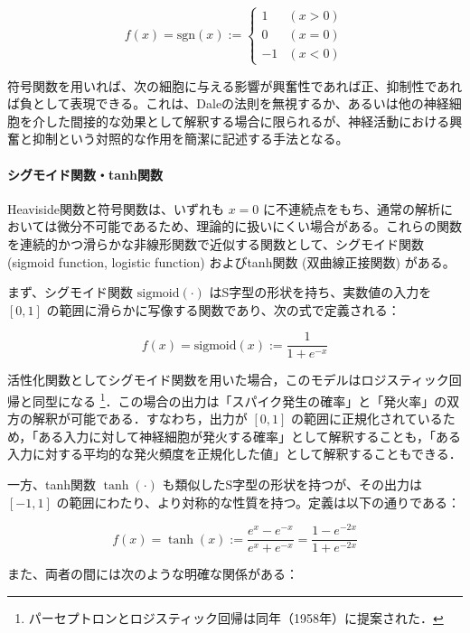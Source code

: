 \documentclass[titlepage]{ltjsbook}
\begin{document}
\begin{equation}
f(x) = \mathrm{sgn}(x):=
\begin{cases}
1 & (x > 0) \\
0 & (x = 0) \\
-1 & (x < 0)
\end{cases}
\end{equation}

符号関数を用いれば、次の細胞に与える影響が興奮性であれば正、抑制性であれば負として表現できる。これは、Daleの法則を無視するか、あるいは他の神経細胞を介した間接的な効果として解釈する場合に限られるが、神経活動における興奮と抑制という対照的な作用を簡潔に記述する手法となる。

\paragraph{シグモイド関数・tanh関数}
Heaviside関数と符号関数は、いずれも $x=0$ に不連続点をもち、通常の解析においては微分不可能であるため、理論的に扱いにくい場合がある。これらの関数を連続的かつ滑らかな非線形関数で近似する関数として、シグモイド関数 (sigmoid function, logistic function) およびtanh関数 (双曲線正接関数) がある。

まず、シグモイド関数 $\mathrm{sigmoid}(\cdot)$ はS字型の形状を持ち、実数値の入力を $[0, 1]$ の範囲に滑らかに写像する関数であり、次の式で定義される：

\begin{equation}
f(x) = \mathrm{sigmoid}(x):= \frac{1}{1 + e^{-x}}
\end{equation}

活性化関数としてシグモイド関数を用いた場合，このモデルはロジスティック回帰と同型になる \footnote{パーセプトロンとロジスティック回帰は同年（1958年）に提案された．}．この場合の出力は「スパイク発生の確率」と「発火率」の双方の解釈が可能である．すなわち，出力が $[0, 1]$ の範囲に正規化されているため，「ある入力に対して神経細胞が発火する確率」として解釈することも，「ある入力に対する平均的な発火頻度を正規化した値」として解釈することもできる．

一方、tanh関数 $\tanh(\cdot)$ も類似したS字型の形状を持つが、その出力は $[-1, 1]$ の範囲にわたり、より対称的な性質を持つ。定義は以下の通りである：

\begin{equation}
f(x) = \tanh(x) := \frac{e^{x} - e^{-x}}{e^{x} + e^{-x}} = \frac{1 - e^{-2x}}{1 + e^{-2x}}
\end{equation}

また、両者の間には次のような明確な関係がある：
\end{document}
